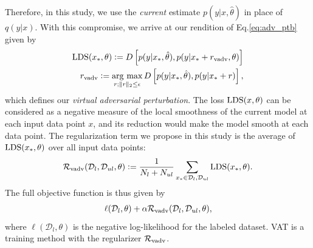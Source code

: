 \documentclass[10pt,journal,compsoc]{IEEEtran}
\newcommand{\argmax}{\mathop{\rm arg~max}\limits}
\newcommand{\defeq}{\vcentcolon=}
\begin{document}
Therefore, in this study, we use the \textit{current} estimate $p(y|x,\hat{\theta})$ in place of $q(y|x)$.
With this compromise, we arrive at our rendition of Eq.\eqref{eq:adv_ptb} given by 
\begin{eqnarray}
	{\rm LDS}(x_*, \theta) \defeq D\left[p(y|x_*,\hat{\theta}),p(y|x_*+r_{\rm vadv},\theta)\right] \label{eq:vadv_loss}\\
  	r_{\rm vadv} \defeq \argmax_{r;\|r\|_{2}\leq\epsilon} D\left[p(y|x_*,\hat{\theta}), p(y|x_*+r)\right],
\end{eqnarray}
which defines our {\it virtual adversarial perturbation}.
The loss ${\rm LDS}(x, \theta)$ can be considered as a negative measure of the local smoothness of the current model at each input data point $x$, and its reduction would make the model smooth at each data point. 
The regularization term we propose in this study is the average of ${\rm LDS}(x_*, \theta)$ over all input data points:
\begin{eqnarray}
	\mathcal{R}_{\rm vadv}(\mathcal{D}_l, \mathcal{D}_{ul}, \theta) \defeq \frac{1}{N_l + N_{ul}}\sum_{x_* \in \mathcal{D}_l, \mathcal{D}_{ul}} {\rm LDS}(x_*, \theta) \label{eq:reg_vadv}.
\end{eqnarray}
The full objective function is thus given by
\begin{align}
\ell(\mathcal{D}_l, \theta) +  \alpha \mathcal{R}_{\rm vadv}(\mathcal{D}_l, \mathcal{D}_{ul}, \theta), \label{eq:full}
\end{align} 
where $\ell(\mathcal{D}_l, \theta)$ is the negative log-likelihood for the labeled dataset. 
VAT is a training method with the regularizer $\mathcal{R}_{\rm
vadv}$.
\end{document}
